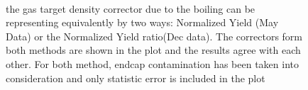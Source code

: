 \begin{figure}[htpb]

\\

\caption{ the gas target density corrector due to the boiling can be representing equivalently by two ways: Normalized Yield (May Data) or the Normalized Yield ratio(Dec data). The correctors form both methods are shown in the plot and the results agree with each other. For both method, endcap contamination has been taken into consideration and only statistic error is included in the plot  }  \label{boiling_plot1}
\end{figure}
